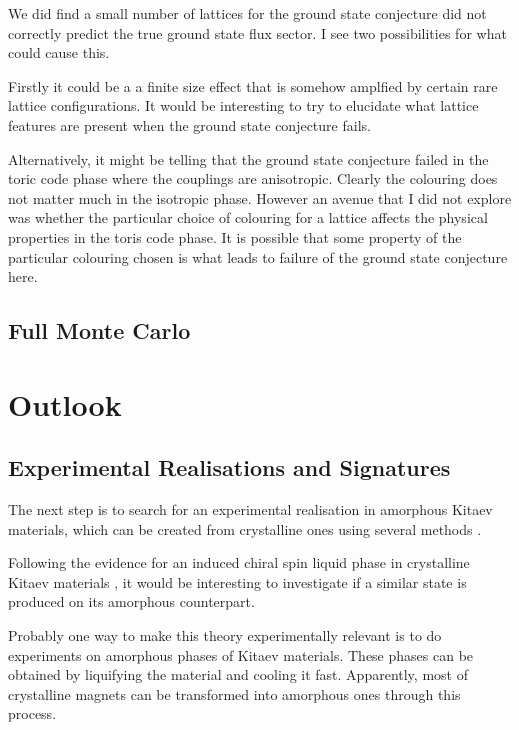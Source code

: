 We did find a small number of lattices for the ground state conjecture did not correctly predict the true ground state flux sector. I see two possibilities for what could cause this.

Firstly it could be a a finite size effect that is somehow amplfied by certain rare lattice configurations. It would be interesting to try to elucidate what lattice features are present when the ground state conjecture fails.

Alternatively, it might be telling that the ground state conjecture failed in the toric code phase where the couplings are anisotropic. Clearly the colouring does not matter much in the isotropic phase. However an avenue that I did not explore was whether the particular choice of colouring for a lattice affects the physical properties in the toris code phase. It is possible that some property of the particular colouring chosen is what leads to failure of the ground state conjecture here.

\hypertarget{full-monte-carlo}{%
\subsection{Full Monte Carlo}\label{full-monte-carlo}}

\hypertarget{outlook}{%
\section{Outlook}\label{outlook}}

\hypertarget{experimental-realisations-and-signatures}{%
\subsection{Experimental Realisations and Signatures}\label{experimental-realisations-and-signatures}}

The next step is to search for an experimental realisation in amorphous Kitaev materials, which can be created from crystalline ones using several methods \autocite{Weaire1976,Petrakovski1981,Kaneyoshi2018}.

Following the evidence for an induced chiral spin liquid phase in crystalline Kitaev materials \autocite{Kasahara2018,Yokoi2021,Yamashita2020,Bruin2022}, it would be interesting to investigate if a similar state is produced on its amorphous counterpart.

Probably one way to make this theory experimentally relevant is to do experiments on amorphous phases of Kitaev materials. These phases can be obtained by liquifying the material and cooling it fast. Apparently, most of crystalline magnets can be transformed into amorphous ones through this process.

